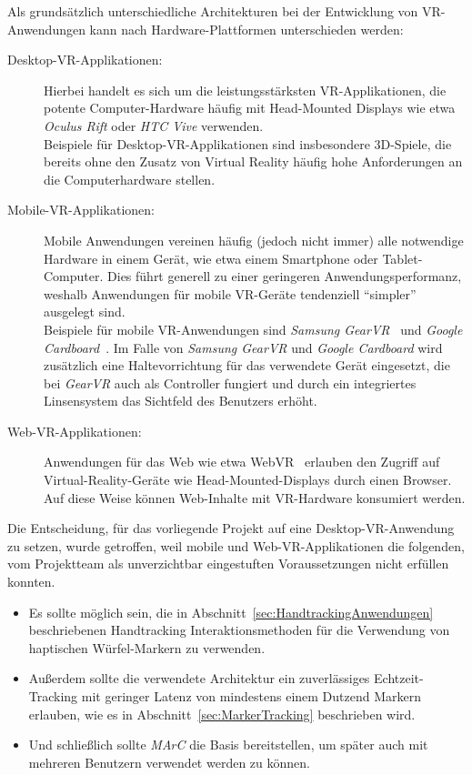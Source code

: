 Als grundsätzlich unterschiedliche Architekturen bei der Entwicklung von VR-An\-wen\-dung\-en kann nach Hardware-Plattformen unterschieden werden:
\begin{description}
	\item[Desktop-VR-Applikationen:] Hierbei handelt es sich um die leistungsstärksten VR-Applikationen, die potente Computer-Hardware häufig mit Head-Mounted Displays wie etwa \textit{Oculus Rift} oder \textit{HTC Vive} verwenden.\\ 
	Beispiele für Desktop-VR-Applikationen sind insbesondere 3D-Spiele, die bereits ohne den Zusatz von Virtual Reality häufig hohe Anforderungen an die Computerhardware stellen.
	\item[Mobile-VR-Applikationen:] Mobile Anwendungen vereinen häufig (jedoch nicht immer) alle notwendige Hardware in einem Gerät, wie etwa einem Smartphone oder Tablet-Computer. Dies führt generell zu einer geringeren Anwendungsperformanz, weshalb Anwendungen für mobile VR-Geräte tendenziell "`simpler"' ausgelegt sind.\\ Beispiele für mobile VR-Anwendungen sind \textit{Samsung GearVR}~\cite{website:gearVRpressRelease} und \textit{Google Cardboard}~\cite{website:googleCardboard}. Im Falle von \textit{Samsung GearVR} und \textit{Google Cardboard} wird zusätzlich eine Haltevorrichtung für das verwendete Gerät eingesetzt, die bei \textit{GearVR} auch als Controller fungiert und durch ein integriertes Linsensystem das Sichtfeld des Benutzers erhöht.
	\item[Web-VR-Applikationen:] Anwendungen für das Web wie etwa WebVR~\cite{website:webVR} erlauben den Zugriff auf Virtual-Reality-Geräte wie Head-Mounted-Displays durch einen Browser. Auf diese Weise können Web-Inhalte mit VR-Hardware konsumiert werden.
\end{description}

Die Entscheidung, für das vorliegende Projekt auf eine Desktop-VR-Anwendung zu setzen, wurde getroffen, weil mobile und Web-VR-Applikationen die folgenden, vom Projektteam als unverzichtbar eingestuften Voraussetzungen nicht erfüllen konnten.

\begin{itemize}
	\item Es sollte möglich sein, die in Abschnitt~\ref{sec:HandtrackingAnwendungen} beschriebenen Handtracking Interaktionsmethoden für die Verwendung von haptischen Würfel-Markern zu verwenden.
	\item Außerdem sollte die verwendete Architektur ein zuverlässiges Echtzeit-Tracking mit geringer Latenz von mindestens einem Dutzend Markern erlauben, wie es in Abschnitt~\ref{sec:MarkerTracking} beschrieben wird.
	\item Und schließlich sollte \emph{MArC} die Basis bereitstellen, um später auch mit mehreren Benutzern verwendet werden zu können.
\end{itemize}


